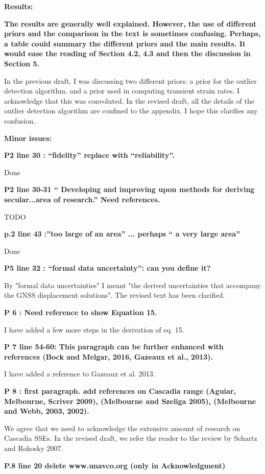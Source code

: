 \documentclass[10pt,a4paper]{letter}
\begin{document}
\begin{letter}{}
\textbf{Results:}

\textbf{The results are generally well explained. However, the use of
different priors and the comparison in the text is sometimes
confusing. Perhaps, a table could summary the different priors and the
main results. It would ease the reading of Section 4.2, 4.3 and then
the discussion in Section 5.}

In the previous draft, I was discussing two different priors: a prior
for the outlier detection algorithm, and a prior used in computing
transient strain rates. I acknowledge that this was convoluted. In the
revised draft, all the details of the outlier detection algorithm are
confined to the appendix. I hope this clarifies any confusion.

\textbf{Minor issues:}

\textbf{P2 line 30 : “fidelity” replace with “reliability”.}

Done

\textbf{P2 line 30-31 “ Developing and improving upon methods for deriving
secular...area of research.” Need references.}

TODO

\textbf{p.2 line 43 :”too large of an area” ... perhaps “ a very large area”}

Done

\textbf{P5 line 32 : “formal data uncertainty”: can you define it?}

By "formal data uncertainties" I meant "the derived uncertainties that
accompany the GNSS displacement solutions". The revised text has been
clarified.

\textbf{P 6 : Need reference to show Equation 15.}

I have added a few more steps in the derivation of eq. 15.

\textbf{P 7 line 54-60: This paragraph can be further enhanced with references
(Bock and Melgar, 2016, Gazeaux et al., 2013).}

I have added a reference to Gazeaux et al. 2013.

\textbf{P 8 : first paragraph. add references on Cascadia range (Aguiar,
Melbourne, Scriver 2009), (Melbourne and Szeliga 2005), (Melbourne and
Webb, 2003, 2002).}

We agree that we need to acknowledge the extensive amount of research
on Cascadia SSEs. In the revised draft, we refer the reader to the
review by Schartz and Rokosky 2007.

\textbf{P.8 line 20 delete www.unavco.org (only in Acknowledgment)}


\end{letter}
\end{document}
